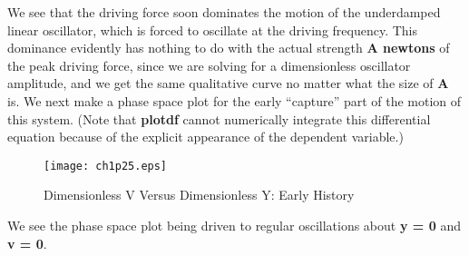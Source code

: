 \documentclass[11pt]{article}
\begin{document}
We see that the driving force soon dominates the motion of the  underdamped linear 
  oscillator, which is forced to oscillate at the driving frequency.
This dominance evidently has nothing to do with the actual strength \textbf{A newtons}
  of the peak driving force, since we are solving for a dimensionless oscillator amplitude, and
  we get the same qualitative curve no matter what the size of \textbf{A} is.  
\newpage
\noindent We next make a phase space plot for the early ``capture'' part of the motion
  of this system. 
(Note that \textbf{plotdf} cannot numerically integrate this differential equation because
  of the explicit appearance of the dependent variable.)  
\smallskip
\begin{figure} [h]  
   \centerline{\texttt{[image: ch1p25.eps]} }
	\caption{Dimensionless V Versus Dimensionless Y: Early History}
\end{figure}

We see the phase space plot being driven to regular oscillations about \textbf{y = 0}
  and \textbf{v = 0}.
\end{document}
